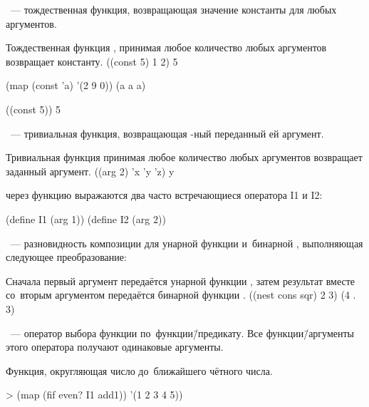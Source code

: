 ~--- тождественная функция, возвращающая значение константы  для любых аргументов.

\begin{example}{Тождественная функция , принимая любое количество любых аргументов возвращает константу.}
\REPL
  {((const 5) 1 2)}
  {5}

\REPL
  {(map (const 'a) '(2 9 0))}
  {(a a a)}

\REPL
  {((const 5))}
  {5}
\end{example}

~--- тривиальная функция, возвращающая -ный переданный ей аргумент.

\begin{example}{Тривиальная функция  принимая любое количество любых аргументов возвращает заданный аргумент.}
\REPL
  {((arg 2) 'x 'y 'z)}
  {y}
\end{example}

через функцию  выражаются два часто встречающиеся оператора \si{I1} и \si{I2}:
\begin{SchemeCode}
  (define I1 (arg 1))
  (define I2 (arg 2))
\end{SchemeCode}

~--- разновидность композиции для унарной функции  и~бинарной , выполняющая следующее преобразование:
\begin{center}
\end{center}

\begin{example}{%
Сначала первый аргумент передаётся унарной функции , затем результат вместе со~вторым аргументом передаётся бинарной функции .} 
\REPL
  {((nest cons sqr) 2 3)}
  {(4 . 3)}
\end{example}

~--- оператор выбора функции по~функции\=/предикату. Все функции\=/аргументы этого оператора получают одинаковые аргументы.

\begin{example}{Функция, округляющая число до~ближайшего чётного числа.}
\begin{ExampleCode}
 > (map (fif even? I1 add1))
        '(1 2 3 4 5))
\end{ExampleCode}
\end{example}

